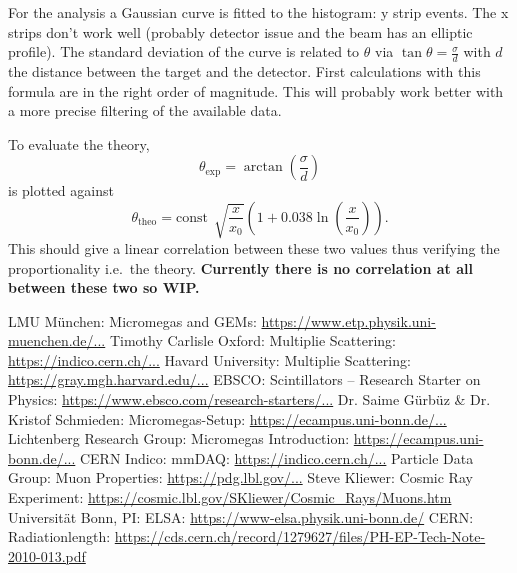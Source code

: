 \documentclass[sn-mathphys-num,iicol]{sn-jnl}
\theoremstyle{thmstyleone}
\theoremstyle{thmstyletwo}
\theoremstyle{thmstylethree}
\begin{document}
For the analysis a Gaussian curve is fitted to the histogram: y strip events.
The x strips don't work well (probably detector issue and the beam has an elliptic profile).
The standard deviation of the curve is related to $\theta $ via $\tan \theta =\tfrac{\sigma }{d}$ with $d$ the distance between the target and the detector.
First calculations with this formula are in the right order of magnitude.
This will probably work better with a more precise filtering of the available data.

To evaluate the theory, $$\theta _\text{exp}=\arctan\left(\dfrac{\sigma }{d}\right)$$ is plotted against $$\theta _\text{theo}=\text{const}\,\sqrt[]{\dfrac{x}{x_0}}\left(1+0.038\ln\left(\dfrac{x}{x_0}\right)\right).$$
This should give a linear correlation between these two values thus verifying the proportionality i.e.\ the theory.
\textbf{Currently there is no correlation at all between these two so WIP.}


\newpage
\begin{thebibliography}{9}

LMU München: Micromegas and GEMs: 
\href{https://www.etp.physik.uni-muenchen.de/research/detector-development/mm-and-gems/index.html}{https://www.etp.physik.uni-muenchen.de/...}
Timothy Carlisle Oxford: Multiplie Scattering: 
\href{https://indico.cern.ch/event/190654/contributions/345614/attachments/270741/378860/CM33_ScatteringOverview.pdf}{https://indico.cern.ch/...}
Havard University: Multiplie Scattering: 
\href{https://gray.mgh.harvard.edu/media/com_dpattachments/attachments/com_content.article/Techniques-of-Proton-Radiotherapy-06-Multiple-Scattering.pdf}{https://gray.mgh.harvard.edu/...}
EBSCO: Scintillators – Research Starter on Physics: 
\href{https://www.ebsco.com/research-starters/physics/scintillators}{https://www.ebsco.com/research-starters/...}
Dr. Saime Gürbüz \& Dr. Kristof Schmieden: Micromegas-Setup: 
\href{https://ecampus.uni-bonn.de/ilias.php?baseClass=ilrepositorygui&cmd=sendfile&ref_id=3786906}{https://ecampus.uni-bonn.de/...}
Lichtenberg Research Group: Micromegas Introduction: 
\href{https://ecampus.uni-bonn.de/ilias.php?baseClass=ilrepositorygui&cmd=sendfile&ref_id=3787243}{https://ecampus.uni-bonn.de/...}
CERN Indico: mmDAQ: 
\href{https://indico.cern.ch/event/240381/contributions/1554638/attachments/406597/564873/20130307-mmdaq1-flow-review-1.pdf}{https://indico.cern.ch/...}
Particle Data Group: Muon Properties: 
\href{https://pdg.lbl.gov/2023/listings/rpp2023-list-muon.pdf}{https://pdg.lbl.gov/...}
Steve Kliewer: Cosmic Ray Experiment:
\href{https://cosmic.lbl.gov/SKliewer/Cosmic_Rays/Muons.htm}{https://cosmic.lbl.gov/SKliewer/Cosmic\_Rays/Muons.htm}
Universität Bonn, PI: ELSA:
\href{https://www-elsa.physik.uni-bonn.de/}{https://www-elsa.physik.uni-bonn.de/}
CERN: Radiationlength:
\href{https://cds.cern.ch/record/1279627/files/PH-EP-Tech-Note-2010-013.pdf}{https://cds.cern.ch/record/1279627/files/PH-EP-Tech-Note-2010-013.pdf}


\end{thebibliography}
\end{document}
